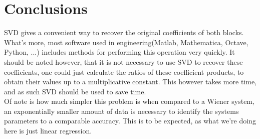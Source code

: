 \section{Conclusions}
SVD gives a convenient way to recover the original coefficients of both blocks. What's more, most software used in engineering(Matlab, Mathematica, Octave, Python, ...) includes methods for performing this operation very quickly. It should be noted however, that it is not necessary to use SVD to recover these coefficients, one could just calculate the ratios of these coefficient products, to obtain their values up to a multiplicative constant.
This however takes more time, and as such SVD should be used to save time.
\\
Of note is how much simpler this problem is when compared to a Wiener system, an exponentially smaller amount of data is necessary to identify the systems parameters to a comparable accuracy. This is to be expected, as what we're doing here is just linear regression.



